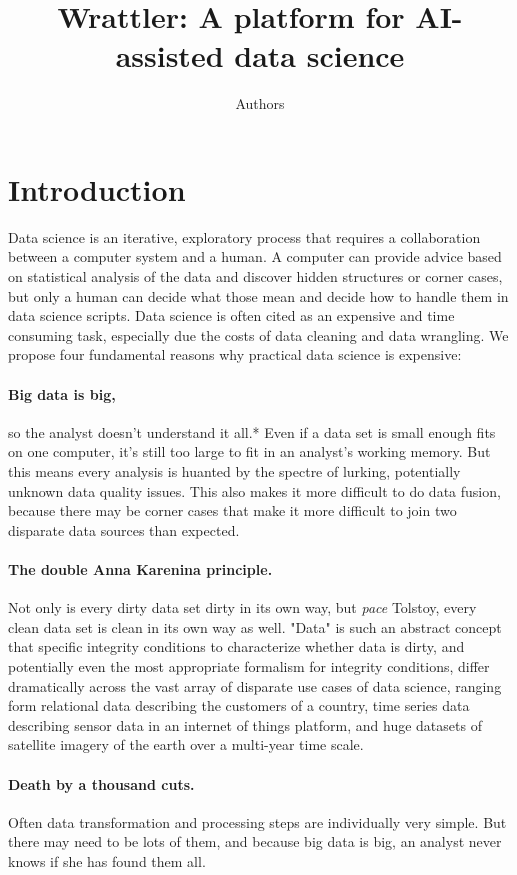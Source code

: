 \documentclass[sigplan,preprint,10pt]{acmart}\settopmatter{printfolios=true,printccs=false,printacmref=false}
\title{Wrattler: \textnormal{A platform for AI-assisted data science}}
\author{Authors}
\theoremstyle{plain}
\theoremstyle{definition}
\begin{document}
\maketitle

\section{Introduction}
Data science is an iterative, exploratory process that requires a collaboration between a
computer system and a human. A computer can provide advice based on statistical analysis of the
data and discover hidden structures or corner cases, but only a human can decide what those mean
and decide how to handle them in data science scripts. Data science is often cited as an expensive
and time consuming task, especially due the costs of data cleaning and data wrangling.
We propose four fundamental reasons why
practical data science is expensive:

\paragraph{Big data is big,}
so the analyst doesn't understand it all.*
Even if a data set is small enough fits on one computer, it's still too large to fit in
an analyst's working memory.
But this means every analysis is huanted
by the spectre of lurking, potentially
unknown data quality  issues.
This also makes it more difficult to do data fusion, because there may be corner cases that make it more difficult to join two disparate data sources than expected.

\paragraph{The double Anna Karenina principle.}
Not only is every dirty data set  dirty in its own way, but \emph{pace} Tolstoy, every clean data set is clean in its own way as well.
"Data" is such an abstract concept that specific integrity conditions to characterize whether data is dirty, and potentially even the most appropriate formalism for integrity conditions,  differ dramatically across
the vast array of disparate use cases of data science,
ranging form relational data describing the customers of a country, time series data describing sensor data in an internet of things platform, and huge datasets of satellite imagery of the earth over a multi-year time scale.

\paragraph{Death by a thousand cuts.}
Often data transformation and processing steps are individually  very simple. But  there may need to be lots of them, and
because big data is big,
an analyst never knows if she has found them all.
\end{document}
